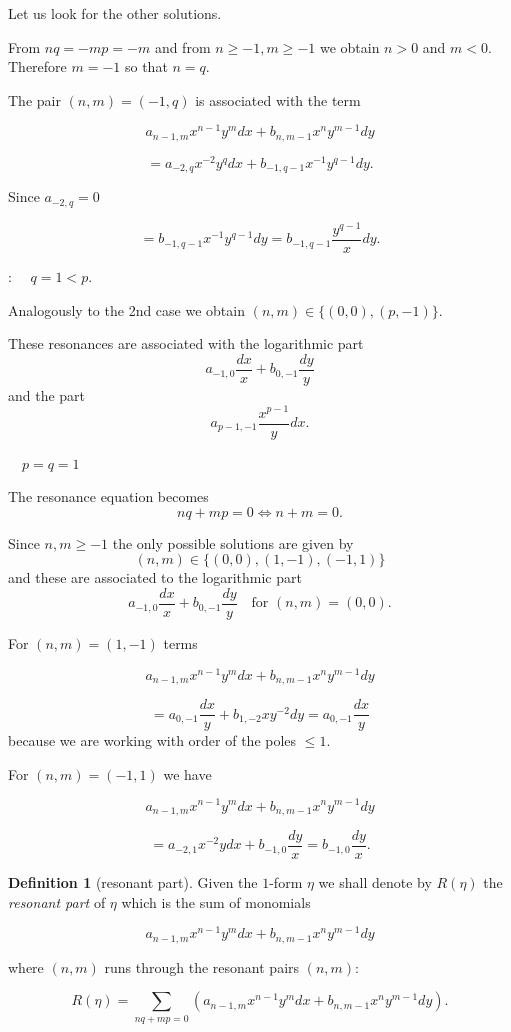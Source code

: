 \documentclass[11pt,a4paper]{amsart}
\theoremstyle{definition}
\newtheorem{definition}[theorem]{Definition}
\begin{document}
Let us look for the other solutions.


From $nq=-mp=-m$ and from $n\ge -1, m\ge -1$
we obtain $n>0$ and $m<0$. Therefore $m=-1$ so that $n=q$.

The pair $(n,m)=(-1,q)$ is associated with the term

\[
a_{n-1,m} x^{n-1}y^m dx + b_{n,m-1} x^n y^{m-1} dy
\]

\[
=
a_{-2,q} x^{-2} y^q dx + b_{-1,q-1} x^{-1} y^{q-1} dy.
\]

Since $a_{-2,q}=0$

\[
=
b_{-1,q-1} x^{-1} y^{q-1} dy
=
b_{-1,q-1}\frac{y^{q-1}}{x} dy.
\]


 : $\quad q=1<p.$

Analogously to the 2nd case we obtain $(n,m)\in\{(0,0),(p,-1)\}$.

These resonances are associated with the logarithmic part
\[
a_{-1,0}\frac{dx}{x} + b_{0,-1}\frac{dy}{y}
\]
and the part
\[
a_{p-1,-1} \frac{x^{p-1}}{y} dx.
\]


 $\quad p=q=1$

The resonance equation becomes
\[
nq+mp=0 \iff n+m=0.
\]

Since $n,m\ge -1$ the only possible solutions are given by
\[
(n,m)\in\{(0,0),(1,-1),(-1,1)\}
\]
and these are associated to the logarithmic part
\[
a_{-1,0}\frac{dx}{x} + b_{0,-1}\frac{dy}{y}
\quad \text{for } (n,m)= (0,0).
\]

For $(n,m)=(1,-1)$ terms

\[
a_{n-1,m} x^{n-1}y^m dx + b_{n,m-1} x^n y^{m-1} dy
\]

\[
=
a_{0,-1}\frac{dx}{y} + b_{1,-2} x y^{-2} dy
=
a_{0,-1}\frac{dx}{y}
\]
because we are working with order of the poles $\le 1$.

For $(n,m)=(-1,1)$ we have

\[
a_{n-1,m} x^{n-1}y^m dx + b_{n,m-1} x^n y^{m-1} dy
\]

\[
=
a_{-2,1} x^{-2} y dx + b_{-1,0}\frac{dy}{x}
=
b_{-1,0}\frac{dy}{x}.
\]


\begin{definition}[resonant part]
Given the $1$-form $\eta$ we shall denote by $R(\eta)$ the {\it resonant part} of $\eta$
which is the sum of monomials

\[
a_{n-1,m} x^{n-1}y^m dx + b_{n,m-1} x^n y^{m-1} dy
\]

where $(n,m)$ runs through the resonant pairs $(n,m)$:

\[
R(\eta) =
\sum_{nq+mp=0}
\left(
a_{n-1,m} x^{n-1}y^m dx + b_{n,m-1} x^n y^{m-1} dy
\right).
\]
\end{definition}
\end{document}
